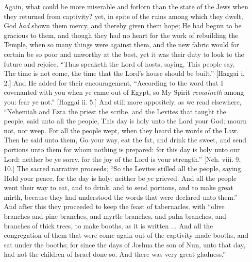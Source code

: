 Again, what could be more miserable and forlorn than the state of
the Jews when they returned from captivity? yet, in spite of the ruins
among which they dwelt, God \emph{had} shown them mercy, and thereby
given them hope; He had begun to be gracious to them, and though they
had no heart for the work of rebuilding the Temple, when so many
things were against them, and the new fabric would for certain be so
poor and unworthy at the best, yet it was their duty to look to the
future and rejoice. ``Thus speaketh the Lord of hosts, saying,
This people say, The time is not come, the time that the Lord's house
should be built.'' [Haggai i. 2.] And He added for their
encouragement, ``According to the word that I covenanted with you
when ye came out of Egypt, so My Spirit \emph{remaineth} among you:
fear ye not.'' [Haggai ii. 5.] And still more appositely, as we
read elsewhere, ``Nehemiah and Ezra the priest the scribe, and the
Levites that taught the people, said unto all the people, This day is
holy unto the Lord your God; mourn not, nor weep. For all the people
wept, when they heard the words of the Law. Then he said unto them, Go
your way, eat the fat, and drink the sweet, and send portions unto
them for whom nothing is prepared: for this day is holy unto our Lord;
neither be ye sorry, for the joy of the Lord is your strength.'' [Neh.
viii. 9, 10.] The sacred narrative proceeds; ``So the Levites
stilled all the people, saying, Hold your peace, for the day is holy;
neither be ye grieved. And all the people went their way to eat, and
to drink, and to send portions, and to make great mirth, because they
had understood the words that were declared unto them.'' And after
this they proceeded to keep the feast of tabernacles, with ``olive
branches and pine branches, and myrtle branches, and palm branches,
and branches of thick trees, to make booths, as it is written ... And
all the congregation of them that were come again out of the captivity
made booths, and sat under the booths; for since the days of Joshua
the son of Nun, unto that day, had not the children of Israel done so.
And there was very great gladness.''

